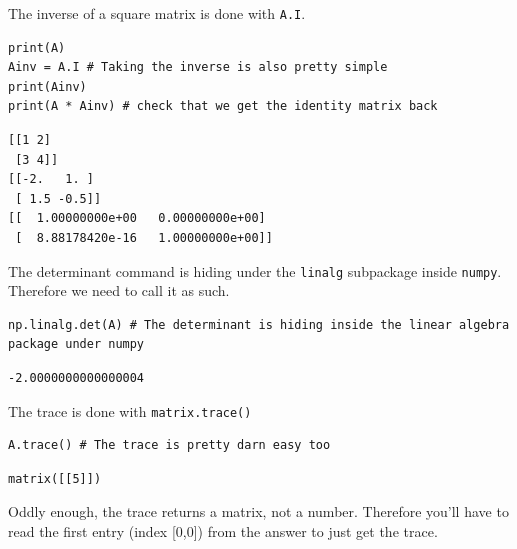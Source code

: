 \begin{example}
    The inverse of a square matrix is done with \texttt{A.I}.

\bcode
\begin{lstlisting}
print(A)
Ainv = A.I # Taking the inverse is also pretty simple
print(Ainv)
print(A * Ainv) # check that we get the identity matrix back
\end{lstlisting}
\boutput
\begin{lstlisting}
[[1 2]
 [3 4]]
[[-2.   1. ]
 [ 1.5 -0.5]]
[[  1.00000000e+00   0.00000000e+00]
 [  8.88178420e-16   1.00000000e+00]]
\end{lstlisting}
\end{example}


\begin{example}
    The determinant command is hiding under the \texttt{linalg} subpackage inside
    \texttt{numpy}.  Therefore we need to call it as such.

\bcode
\begin{lstlisting}
np.linalg.det(A) # The determinant is hiding inside the linear algebra package under numpy
\end{lstlisting}
\boutput
\begin{lstlisting}
-2.0000000000000004
\end{lstlisting}
\end{example}


\begin{example}
    The trace is done with \texttt{matrix.trace()}

\bcode
\begin{lstlisting}
A.trace() # The trace is pretty darn easy too
\end{lstlisting}
\boutput
\begin{lstlisting}
matrix([[5]])
\end{lstlisting}
Oddly enough, the trace returns a matrix, not a number.  Therefore you'll have to read the
first entry (index [0,0]) from the answer to just get the trace.
\end{example}



